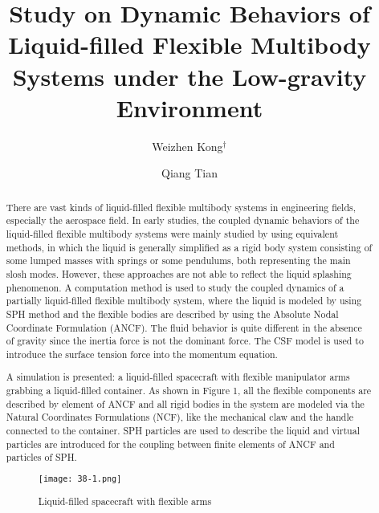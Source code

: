 \documentclass[10pt]{article}
\title{Study on Dynamic Behaviors of Liquid-filled Flexible Multibody Systems under the Low-gravity Environment}
\date{}
\author[$\relax$]{Weizhen Kong$^\dagger$}
\affil[$\relax$]{Beijing Institute of Technology, China}
\author[$\relax$]{Qiang Tian}
\affil[$\relax$]{\href{mailto:weizhen_kong@aliyun.com}{weizhen\_kong@aliyun.com}}
\begin{document}
\maketitle


\begin{abstract}
There are vast kinds of liquid-filled flexible multibody systems in engineering fields, especially the aerospace field. In early studies, the coupled dynamic behaviors of the liquid-filled flexible multibody systems were mainly studied by using equivalent methods, in which the liquid is generally simplified as a rigid body system consisting of some lumped masses with springs or some pendulums, both representing the main slosh modes. However, these approaches are not able to reflect the liquid splashing phenomenon. A computation method is used to study the coupled dynamics of a partially liquid-filled flexible multibody system, where the liquid is modeled by using SPH method and the flexible bodies are described by using the Absolute Nodal Coordinate Formulation (ANCF). The fluid behavior is quite different in the absence of gravity since the inertia force is not the dominant force. The CSF model is used to introduce the surface tension force into the momentum equation.

A simulation is presented: a liquid-filled spacecraft with flexible manipulator arms grabbing a liquid-filled container. As shown in Figure 1, all the flexible components are described by element of ANCF and all rigid bodies in the system are modeled via the Natural Coordinates Formulations (NCF), like the mechanical claw and the handle connected to the container. SPH particles are used to describe the liquid and virtual particles are introduced for the coupling between finite elements of ANCF and particles of SPH.
\begin{figure}[!htb]
\centering
\texttt{[image: 38-1.png]}
\caption{Liquid-filled spacecraft with flexible arms}\label{fig:38}
\end{figure}

\end{abstract}



\end{document}
